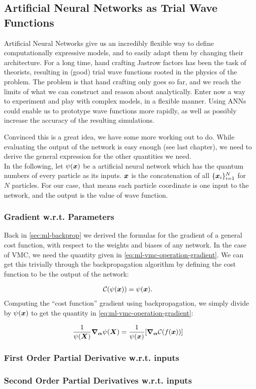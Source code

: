 \documentclass[Thesis.tex]{subfiles}
\begin{document}
\subsection{Artificial Neural Networks as Trial Wave Functions}

Artificial Neural Networks give us an incredibly flexible way to define
computationally expressive models, and to easily adapt them by changing their
architecture. For a long time, hand crafting Jastrow factors has been the task
of theorists, resulting in (good) trial wave functions rooted in the physics of
the problem. The problem is that hand crafting only goes so far, and we reach
the limits of what we can construct and reason about analytically. Enter now a
way to experiment and play with complex models, in a flexible manner. Using ANNs
could enable us to prototype wave functions more rapidly, as well as possibly
increase the accuracy of the resulting simulations.

Convinced this is a great idea, we have some more working out to do. While
evaluating the output of the network is easy enough (see last chapter), we need
to derive the general expression for the other quantities we need.\\

In the following, let $\psi(\bm{x})$ be a artificial neural network which has the
quantum numbers of every particle as its inputs. $\bm{x}$ is the concatenation of
all $\{\bm{x}_i\}_{i=1}^N$ for $N$ particles. For our case, that means each
particle coordinate is one input to the network, and the output is the value of
wave function.

\subsubsection{Gradient w.r.t. Parameters}

Back in \cref{sec:ml-backprop} we derived the formulas for the gradient of a
general cost function, with respect to the weights and biases of any network. In
the case of VMC, we need the quantity given in
\cref{eq:ml-vmc-operation-gradient}. We can get this trivially through the
backpropagation algorithm by defining the cost function to be the output of the
network:

\begin{align}
  \mathcal{C}(\psi(\bm{x})) = \psi(\bm{x}).
\end{align}
Computing the ``cost function'' gradient using backpropagation, we simply divide
by $\psi(\bm{x})$ to get the quantity in \cref{eq:ml-vmc-operation-gradient}:

\begin{align}
    \frac{1}{\psi(\bm{X})}\grad_{\bm{\alpha}}{\psi(\bm{X})} = \frac{1}{\psi(\bm{x})}\qty[\grad_{\bm{\alpha}}{\mathcal{C}(f(\bm{x}))}]
\end{align}

\subsubsection{First Order Partial Derivative w.r.t. inputs}



\subsubsection{Second Order Partial Derivatives w.r.t. inputs}
\end{document}
